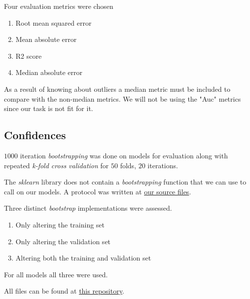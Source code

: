 \documentclass[12pt, a4paper]{article}
\begin{document}
\begin{multicols}{2}
    Four evaluation metrics were chosen
    \newline

    \begin{enumerate} \label{enm:metrics}
        \item Root mean squared error
        \item Mean absolute error
        \item R2 score
        \item Median absolute error
    \end{enumerate}

    As a result of knowing about outliers a median metric must be included to compare with the non-median metrics. We will not be using the "Auc" metrics since our task is not fit for it.
    \newline

    \subsection{Confidences} \label{subsec:conf}

    $1000$ iteration \textit{bootstrapping} was done on models for evaluation along with repeated \textit{k-fold cross validation} for $50$ folds, $20$ iterations.
    \newline

    The \textit{sklearn} library \cite{noauthor_scikit-learn_nodate} does not contain a \textit{bootstrapping} function that we can use to call on our models. A protocol was written at \href{https://github.com/ArisPodotas/Assignment-1-MLICB/blob/main/src/functions.py}{our source files}.
    \newline

    Three distinct \textit{bootstrap} implementations were assessed.
    \newline

    \begin{enumerate} \label{enm:bootstrap}
        \item Only altering the training set
        \item Only altering the validation set
        \item Altering both the training and validation set
    \end{enumerate}

    For all models all three were used.
    \newline

    All files can be found at \href{https://github.com/ArisPodotas/Assignment-2-MLICB}{this repository}.
    \newline


\end{multicols}
\end{document}
